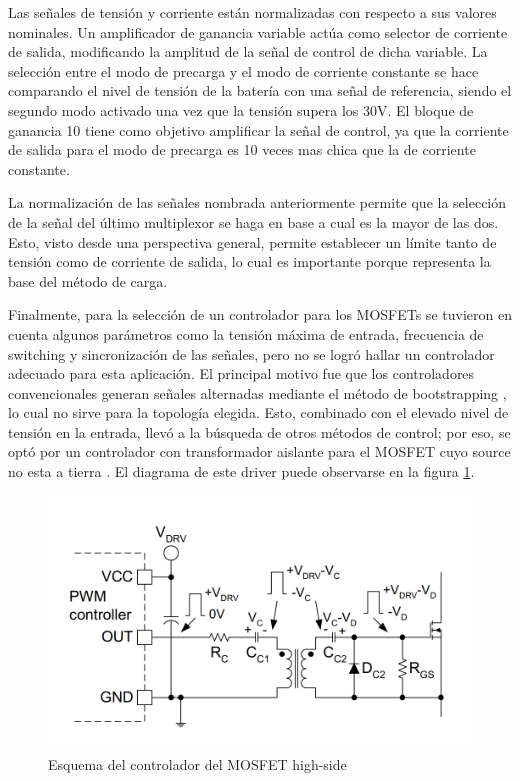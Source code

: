 Las señales de tensión y corriente están normalizadas con respecto a sus valores nominales.
Un amplificador de ganancia variable actúa como selector de corriente de salida,
modificando la amplitud de la señal de control de dicha variable.
La selección entre el modo de precarga y el modo de corriente constante se hace comparando el nivel de tensión de la batería
con una señal de referencia, siendo el segundo modo activado una vez que la tensión supera los 30V.
El bloque de ganancia 10 tiene como objetivo amplificar la señal de control, ya que la corriente de salida para el modo
de precarga es 10 veces mas chica que la de corriente constante.

La normalización de las señales nombrada anteriormente permite que la selección de la señal del último multiplexor
se haga en base a cual es la mayor de las dos. Esto, visto desde una perspectiva general, permite establecer un límite
tanto de tensión como de corriente de salida, lo cual es importante porque representa la base del método de carga.

Finalmente, para la selección de un controlador para los MOSFETs se tuvieron en cuenta algunos parámetros como
la tensión máxima de entrada, frecuencia de switching y sincronización de las señales,
pero no se logró hallar un controlador adecuado para esta aplicación.
El principal motivo fue que los controladores convencionales generan señales alternadas mediante el método de bootstrapping \cite{hart},
lo cual no sirve para la topología elegida. Esto, combinado con el elevado nivel de tensión en la entrada,
llevó a la búsqueda de otros métodos de control; por eso, se optó por un controlador con transformador aislante para el MOSFET cuyo source no esta a tierra \cite{gatedrivers}. El diagrama de este driver puede observarse en la figura \ref{fig:driver}.

\begin{figure}
    \centering
    \includegraphics[width=\textwidth]{images/esquema_driver.png}
    \caption{Esquema del controlador del MOSFET high-side}
    \label{fig:driver}
\end{figure}

